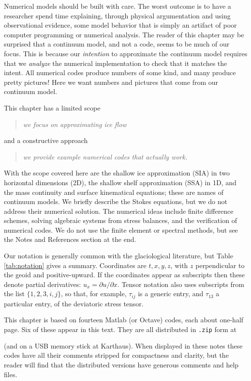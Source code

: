 \documentclass[titlepage,letterpaper,final,12pt]{scrartcl}
\begin{document}
Numerical models should be built with care.  The worst outcome is to have a researcher spend time explaining, through physical argumentation and using observational evidence, some model behavior that is simply an artifact of poor computer programming or numerical analysis.  The reader of this chapter may be surprised that a continuum model, and not a code, seems to be much of our focus.  This is because our \emph{intention} to approximate the continuum model requires that we \emph{analyze} the numerical implementation to check that it matches the intent.  All numerical codes produce numbers of some kind, and many produce pretty pictures!  Here we want numbers and pictures that come from our continuum model.

This chapter has a limited scope
  \begin{quote}\emph{we focus on approximating ice flow}\end{quote}
and a constructive approach
  \begin{quote}\emph{we provide example numerical codes that actually work.}\end{quote}
With the scope covered here are the shallow ice approximation (SIA) in two horizontal dimensions (2D), the shallow shelf approximation (SSA) in 1D, and the mass continuity and surface kinematical equations; these are names of continuum models.  We briefly describe the Stokes equations, but we do not address their numerical solution.  The numerical ideas include finite difference schemes, solving algebraic systems from stress balances, and the verification of numerical codes.  We do not use the finite element or spectral methods, but see the Notes and References section at the end.

Our notation is generally common with the glaciological literature, but Table \ref{tab:notation} gives a summary.  Coordinates are $t,x,y,z$, with $z$ perpendicular to the geoid and positive-upward.  If the coordinates appear as subscripts then these denote partial derivatives: $u_x = \partial u/\partial x$.  Tensor notation also uses subscripts from the list $\{1,2,3,i,j\}$, so that, for example, $\tau_{ij}$ is a generic entry, and $\tau_{13}$ a particular entry, of the deviatoric stress tensor.

This chapter is based on fourteen Matlab (or Octave) codes, each about one-half page.  Six of these appear in this text.  They are all distributed in \texttt{.zip} form at
\begin{quote}
\end{quote}
\noindent (and on a USB memory stick at Karthaus).  When displayed in these notes these codes have all their comments stripped for compactness and clarity, but the reader will find that the distributed versions have generous comments and help files.
\end{document}
